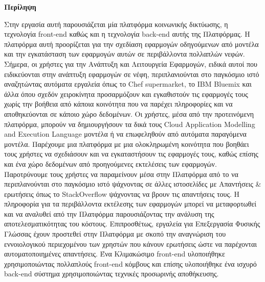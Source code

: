 \thispagestyle{empty}
\begin{titlepage}
\begin{center}
{\bf\Large{Περίληψη}}\\
\end{center}

\indent Στην εργασία αυτή παρουσιάζεται μία πλατφόρμα κοινωνικής δικτύωσης, η τεχνολογία front-end καθώς και η τεχνολογία back-end αυτής της Πλατφόρμας. H πλατφόρμα αυτή προορίζεται για την σχεδίαση εφαρμογών οδηγούμενων από μοντέλα και την εγκατάσταση των εφαρμογών αυτών σε περιβάλλοντα πολλαπλών νεφών. Σήμερα, οι χρήστες για την Ανάπτυξη και Λειτουργεία Εφαρμογών, ειδικά αυτοί που ειδικεύονται στην ανάπτυξη εφαρμογών σε νέφη, περιπλανιούνται στο παγκόσμιο ιστό αναζητώντας αυτόματα εργαλεία όπως το Chef supermarket, το IBM Bluemix και άλλα όπου σχεδόν χειροκίνητα προσαρμόζουν και εγκαθιστούν τις εφαρμογές τους χωρίς την βοήθεια από κάποια κοινότητα που να παρέχει πληροφορίες και να αποθηκεύονται σε κάποιο χώρο δεδομένων. Οι χρήστες, μέσα από την προτεινόμενη πλατφόρμα, μπορούν να δημιουργήσουν τα δικά τους Cloud Application Modelling and Execution Language μοντέλα ή να επωφεληθούν από αυτόματα παραγόμενα μοντέλα. Παρέχουμε μια πλατφόρμα με μια ολοκληρωμένη  κοινότητα που βοηθάει τους χρήστες να σχεδιάσουν και να εγκαταστήσουν τις εφαρμογές τους, καθώς επίσης και ένα χώρο δεδομένων από προηγούμενες εκτελέσεις των εφαρμογών. Παροτρύνουμε τους χρήστες να παραμείνουν μέσα στην Πλατφόρμα από το να περιπλανούνται στο παγκόσμιο ιστό ψάχνοντας σε άλλες ιστοσελίδες με Απαντήσεις \& ερωτήσεις όπως το StackOverflow ψάχνοντας να βρουν τις απαντήσεις τους. H πληροφορία για τα περιβάλλοντα εκτέλεσης των εφαρμογών μπορεί να μεταφορτωθεί και να αναλυθεί από την Πλατφόρμα παρουσιάζοντας την ανάλυση της αποτελεσματικότητας του κόστους. Επιπροσθέτως, εργαλεία για Επεξεργασία Φυσικής Γλώσσας έχουν προστεθεί στην Πλατφόρμα με σκοπό την αναγνώριση του εννοιολογικού περιεχομένου των χρηστών που κάνουν ερωτήσεις ώστε να παρέχονται αυτοματοποιημένες απαντήσεις. Ένα Κλιμακώσιμο front-end υλοποιήθηκε χρησιμοποιώντας πολλαπλούς front-end κόμβους και επίσης υλοποιήθηκε ένα ισχυρό back-end σύστημα χρησιμοποιώντας τεχνικές προσωρινής αποθήκευσης. 

\vfill

\end{titlepage}

